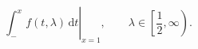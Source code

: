 \documentclass[nofonts]{ctexart}
\begin{document}
\[
	\left.
	\int_-^x f(t,\lambda) \, \mathrm{d}t
	\right|_{x=1}, \qquad
	\lambda \in \left[ \frac{1}{2}, \infty \right).
\]
\end{document}
